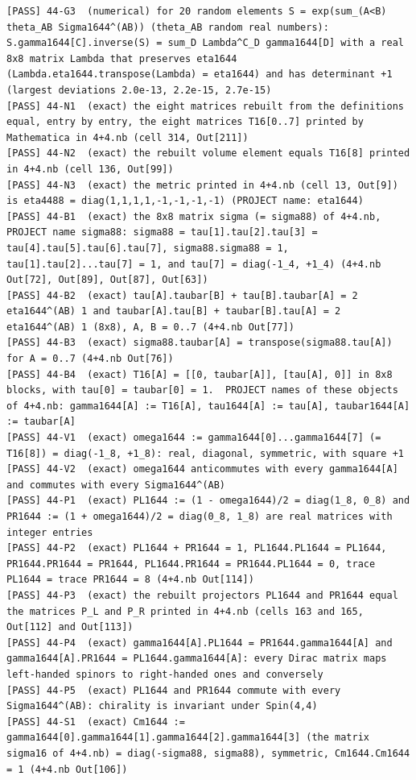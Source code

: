 \documentclass[
  10pt,
]{article}
\begin{document}
\begin{verbatim}
[PASS] 44-G3  (numerical) for 20 random elements S = exp(sum_(A<B) theta_AB Sigma1644^(AB)) (theta_AB random real numbers):  S.gamma1644[C].inverse(S) = sum_D Lambda^C_D gamma1644[D] with a real 8x8 matrix Lambda that preserves eta1644 (Lambda.eta1644.transpose(Lambda) = eta1644) and has determinant +1 (largest deviations 2.0e-13, 2.2e-15, 2.7e-15)
[PASS] 44-N1  (exact) the eight matrices rebuilt from the definitions equal, entry by entry, the eight matrices T16[0..7] printed by Mathematica in 4+4.nb (cell 314, Out[211])
[PASS] 44-N2  (exact) the rebuilt volume element equals T16[8] printed in 4+4.nb (cell 136, Out[99])
[PASS] 44-N3  (exact) the metric printed in 4+4.nb (cell 13, Out[9]) is eta4488 = diag(1,1,1,1,-1,-1,-1,-1) (PROJECT name: eta1644)
[PASS] 44-B1  (exact) the 8x8 matrix sigma (= sigma88) of 4+4.nb, PROJECT name sigma88: sigma88 = tau[1].tau[2].tau[3] = tau[4].tau[5].tau[6].tau[7], sigma88.sigma88 = 1, tau[1].tau[2]...tau[7] = 1, and tau[7] = diag(-1_4, +1_4) (4+4.nb Out[72], Out[89], Out[87], Out[63])
[PASS] 44-B2  (exact) tau[A].taubar[B] + tau[B].taubar[A] = 2 eta1644^(AB) 1 and taubar[A].tau[B] + taubar[B].tau[A] = 2 eta1644^(AB) 1 (8x8), A, B = 0..7 (4+4.nb Out[77])
[PASS] 44-B3  (exact) sigma88.taubar[A] = transpose(sigma88.tau[A]) for A = 0..7 (4+4.nb Out[76])
[PASS] 44-B4  (exact) T16[A] = [[0, taubar[A]], [tau[A], 0]] in 8x8 blocks, with tau[0] = taubar[0] = 1.  PROJECT names of these objects of 4+4.nb: gamma1644[A] := T16[A], tau1644[A] := tau[A], taubar1644[A] := taubar[A]
[PASS] 44-V1  (exact) omega1644 := gamma1644[0]...gamma1644[7] (= T16[8]) = diag(-1_8, +1_8): real, diagonal, symmetric, with square +1
[PASS] 44-V2  (exact) omega1644 anticommutes with every gamma1644[A] and commutes with every Sigma1644^(AB)
[PASS] 44-P1  (exact) PL1644 := (1 - omega1644)/2 = diag(1_8, 0_8) and PR1644 := (1 + omega1644)/2 = diag(0_8, 1_8) are real matrices with integer entries
[PASS] 44-P2  (exact) PL1644 + PR1644 = 1, PL1644.PL1644 = PL1644, PR1644.PR1644 = PR1644, PL1644.PR1644 = PR1644.PL1644 = 0, trace PL1644 = trace PR1644 = 8 (4+4.nb Out[114])
[PASS] 44-P3  (exact) the rebuilt projectors PL1644 and PR1644 equal the matrices P_L and P_R printed in 4+4.nb (cells 163 and 165, Out[112] and Out[113])
[PASS] 44-P4  (exact) gamma1644[A].PL1644 = PR1644.gamma1644[A] and gamma1644[A].PR1644 = PL1644.gamma1644[A]: every Dirac matrix maps left-handed spinors to right-handed ones and conversely
[PASS] 44-P5  (exact) PL1644 and PR1644 commute with every Sigma1644^(AB): chirality is invariant under Spin(4,4)
[PASS] 44-S1  (exact) Cm1644 := gamma1644[0].gamma1644[1].gamma1644[2].gamma1644[3] (the matrix sigma16 of 4+4.nb) = diag(-sigma88, sigma88), symmetric, Cm1644.Cm1644 = 1 (4+4.nb Out[106])

\end{verbatim}
\end{document}
